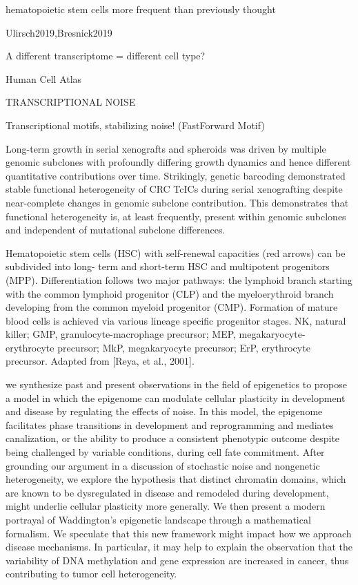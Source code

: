 hematopoietic stem cells more frequent than previously thought\cite{Lee-Six2018}

Ulirsch2019,Bresnick2019


A different transcriptome = different cell type? 

Human Cell Atlas

TRANSCRIPTIONAL NOISE

Transcriptional motifs, stabilizing noise! (FastForward Motif)


 Long-term growth in serial xenografts and spheroids was driven by multiple genomic subclones with profoundly differing growth dynamics and hence different quantitative contributions over time. Strikingly, genetic barcoding demonstrated stable functional heterogeneity of CRC TcICs during serial xenografting despite near-complete changes in genomic subclone contribution. This demonstrates that functional heterogeneity is, at least frequently, present within genomic subclones and independent of mutational subclone differences.\cite{Giessler2017}


Hematopoietic stem cells (HSC) with self-renewal capacities (red arrows) can be subdivided into long-
term and short-term HSC and multipotent progenitors (MPP). Differentiation follows two major
pathways: the lymphoid branch starting with the common lymphoid progenitor (CLP) and the
myeloerythroid branch developing from the common myeloid progenitor (CMP). Formation of mature
blood cells is achieved via various lineage specific progenitor stages. NK, natural killer; GMP,
granulocyte-macrophage precursor; MEP, megakaryocyte-erythrocyte precursor; MkP, megakaryocyte
precursor; ErP, erythrocyte precursor. Adapted from [Reya, et al., 2001].


we synthesize past and present observations in the field of epigenetics to propose a model in which the epigenome can modulate cellular plasticity in development and disease by regulating the effects of noise. In this model, the epigenome facilitates phase transitions in development and reprogramming and mediates canalization, or the ability to produce a consistent phenotypic outcome despite being challenged by variable conditions, during cell fate commitment. After grounding our argument in a discussion of stochastic noise and nongenetic heterogeneity, we explore the hypothesis that distinct chromatin domains, which are known to be dysregulated in disease and remodeled during development, might underlie cellular plasticity more generally. We then present a modern portrayal of Waddington's epigenetic landscape through a mathematical formalism. We speculate that this new framework might impact how we approach disease mechanisms. In particular, it may help to explain the observation that the variability of DNA methylation and gene expression are increased in cancer, thus contributing to tumor cell heterogeneity.





